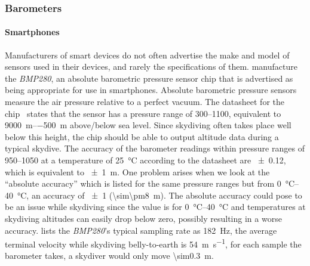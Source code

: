 \subsubsection{Barometers}\label{subsubsec:barometers} %
\paragraph{Smartphones}\label{smartphones-barometers}
Manufacturers of smart devices do not often advertise the make and model of sensors used in their devices, and rarely the specifications of them. \citeauthor{bosch_bmp280:_2016} manufacture the \textit{BMP280}, an absolute barometric pressure sensor chip that is advertised as being appropriate for use in smartphones. Absolute barometric pressure sensors measure the air pressure relative to a perfect vacuum. The datasheet for the chip~\cite{bosch_bmp280:_2016} states that the sensor has a pressure range of \SIrange{300}{1100}{\hPa}, equivalent to \SIrange{+9000}{-500}{\metre} above/below sea level. Since skydiving often takes place well below this height, the chip should be able to output altitude data during a typical skydive. The accuracy of the barometer readings within pressure ranges of \SIrange{950}{1050}{\hPa} at a temperature of \SI{25}{\degreeCelsius} according to the datasheet are \SI{\pm0.12}{\hPa}, which is equivalent to \SI{\pm1}{\metre}. One problem arises when we look at the ``absolute accuracy'' which is listed for the same pressure ranges but from \SIrange{0}{40}{\degreeCelsius}, an accuracy of \SI{\pm1}{\hPa} (\SI{\sim\pm8}{\metre}). The absolute accuracy could pose to be an issue while skydiving since the value is for \SIrange{0}{40}{\degreeCelsius} and temperatures at skydiving altitudes can easily drop below zero, possibly resulting in a worse accuracy. \citeauthor{bosch_bmp280:_2016} lists the \textit{BMP280}'s typical sampling rate as \SI{182}{\Hz}, the average terminal velocity while skydiving belly-to-earth is \SI{54}{\metre\per\second}, for each sample the barometer takes, a skydiver would only move \SI{\sim0.3}{\metre}.

